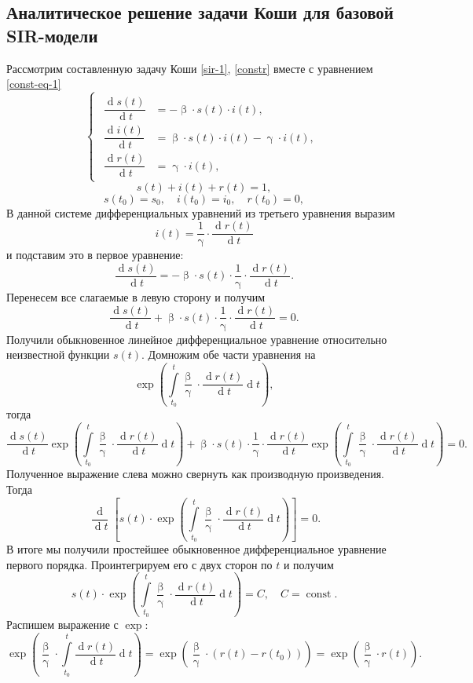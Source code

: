 \documentclass[a4paper, 14pt]{extreport}
\renewcommand{\beta}{\upbeta}
\renewcommand{\gamma}{\upgamma}
\renewcommand{\d}{\operatorname{d}}
\begin{document}
	\subsection{Аналитическое решение задачи Коши для базовой SIR-модели}
	Рассмотрим составленную задачу Коши \eqref{sir-1}, \eqref{constr} вместе с уравнением \eqref{const-eq-1}
	$$
	\left\{ 
	\begin{gathered} 
		\begin{aligned}
			\dfrac {\d s(t)}{\d t} &= -\beta \cdot s(t) \cdot i(t),\\
			\dfrac{\d i(t)}{\d t} &= \beta \cdot s(t)\cdot i(t) - \gamma\cdot i(t),\\
			\dfrac{\d r(t)}{\d t} &= \gamma\cdot i(t),
		\end{aligned}
	\end{gathered} 
	\right.
	$$
	$$
	s(t) + i(t) + r(t) = 1,
	$$
	$$
	s(t_0) = s_0,\quad i(t_0) = i_0,\quad r(t_0) = 0,
	$$
	В данной системе дифференциальных уравнений из третьего уравнения выразим $$i(t) = \dfrac1\gamma\cdot \dfrac{\d r(t)}{\d t}$$ и подставим это в первое уравнение:
	$$\dfrac {\d s(t)}{\d t} = -\beta \cdot s(t) \cdot \dfrac1\gamma\cdot\dfrac{\d r(t)}{\d t}.$$
	Перенесем все слагаемые в левую сторону и получим 
	$$\dfrac {\d s(t)}{\d t} +\beta \cdot s(t) \cdot \dfrac1\gamma\cdot\dfrac{\d r(t)}{\d t} = 0.$$
	Получили обыкновенное линейное дифференциальное уравнение относительно неизвестной функции $s(t)$. Домножим обе части уравнения на $$\exp \left(\int\limits_{t_0}^t \dfrac \beta \gamma\cdot \dfrac{\d r(t)}{\d t} \d t \right),$$
	тогда
	$$\dfrac {\d s(t)}{\d t} \exp \left(\int\limits_{t_0}^t \dfrac \beta \gamma\cdot \dfrac{\d r(t)}{\d t} \d t \right) +\beta \cdot s(t) \cdot \dfrac1\gamma\cdot\dfrac{\d r(t)}{\d t} \exp \left(\int\limits_{t_0}^t \dfrac \beta \gamma\cdot \dfrac{\d r(t)}{\d t} \d t \right) = 0.$$
	Полученное выражение слева можно свернуть как производную произведения. Тогда 
	$$\dfrac{\d}{\d t}\left[s(t)\cdot \exp \left(\int\limits_{t_0}^t \dfrac \beta \gamma\cdot \dfrac{\d r(t)}{\d t} \d t \right)\right] = 0.$$
	В итоге мы получили простейшее обыкновенное дифференциальное уравнение первого порядка. Проинтегрируем его с двух сторон по $t$ и получим
	$$s(t)\cdot \exp \left(\int\limits_{t_0}^t \dfrac \beta \gamma\cdot \dfrac{\d r(t)}{\d t} \d t \right) = C,\quad C = \operatorname{const}.$$
	Распишем выражение с $\exp$: $$\exp \left(\dfrac \beta \gamma\cdot\int\limits_{t_0}^t  \dfrac{\d r(t)}{\d t} \d t \right) = \exp \left(\dfrac \beta \gamma\cdot( r(t) - r(t_0))\right) = \exp \left(\dfrac \beta \gamma\cdot r(t)\right).$$
\end{document}

